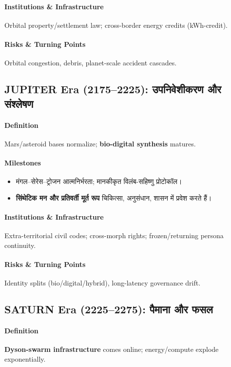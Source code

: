 \documentclass[11pt]{article}
\begin{document}
\begin{itemize}[noitemsep]
\begin{itemize}[noitemsep]
\begin{itemize}[noitemsep]
\begin{itemize}[noitemsep]
\begin{itemize}[noitemsep]
\begin{itemize}[noitemsep]
\paragraph{Institutions \& Infrastructure} Orbital property/settlement law; cross-border energy credits (kWh-credit).

\paragraph{Risks \& Turning Points} Orbital congestion, debris, planet-scale accident cascades.

\subsection{JUPITER Era (2175–2225): उपनिवेशीकरण और संश्लेषण}
\paragraph{Definition} Mars/asteroid bases normalize; \textbf{bio-digital synthesis} matures.

\paragraph{Milestones}
\begin{itemize}[noitemsep]
  \item मंगल–सेरेस–ट्रोजन आत्मनिर्भरता; मानकीकृत विलंब-सहिष्णु प्रोटोकॉल।
  \item \textbf{सिंथेटिक मन और प्रतिवर्ती मूर्त रूप} चिकित्सा, अनुसंधान, शासन में प्रवेश करते हैं।
\end{itemize}

\paragraph{Institutions \& Infrastructure} Extra-territorial civil codes; cross-morph rights; frozen/returning persona continuity.

\paragraph{Risks \& Turning Points} Identity splits (bio/digital/hybrid), long-latency governance drift.

\subsection{SATURN Era (2225–2275): पैमाना और फसल}
\paragraph{Definition} \textbf{Dyson-swarm infrastructure} comes online; energy/compute explode exponentially.


\end{itemize}
\end{itemize}
\end{itemize}
\end{itemize}
\end{itemize}
\end{itemize}
\end{document}
